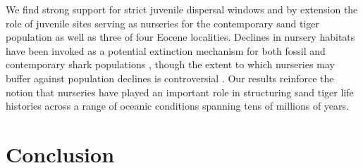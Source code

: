 \documentclass[]{rsos}%
\begin{document}
We find strong support for strict juvenile dispersal windows and by extension the role of juvenile sites serving as nurseries for the contemporary sand tiger population as well as three of four Eocene localities. %
Declines in nursery habitats have been invoked as a potential extinction mechanism for both fossil \cite{Pimiento2010} and contemporary shark populations \cite{heupel2007shark, heithaus2007nursery}, though the extent to which nurseries may buffer against population declines is controversial \cite{kinney2009reassessing}.
Our results reinforce the notion that nurseries have played an important role in structuring sand tiger life histories across a range of oceanic conditions spanning tens of millions of years.






\section{Conclusion}
\end{document}

